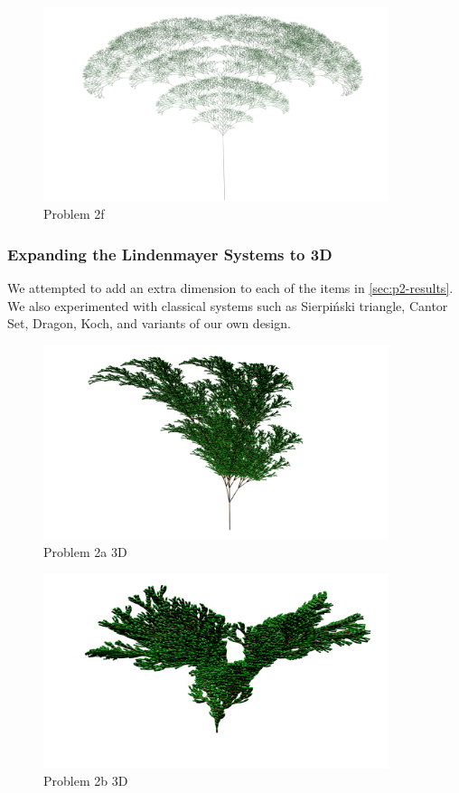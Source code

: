 \begin{figure}[H]
    \centering
    \includegraphics[width=0.90\textwidth]{figures/L-systems/f.png}
    \caption{Problem 2f}\label{fig:prob2f}
\end{figure}

\subsubsection{Expanding the Lindenmayer Systems to 3D}
We attempted to add an extra dimension to each of the items in \autoref{sec:p2-results}.
We also experimented with classical systems such as
Sierpiński triangle, Cantor Set, Dragon, Koch, and variants of our own design.

\begin{figure}[H]
    \centering
    \includegraphics[width=0.90\textwidth]{figures/L-systems/a3d.png}
    \caption{Problem 2a 3D}\label{fig:prob2a_3d}
\end{figure}

\begin{figure}[H]
    \centering
    \includegraphics[width=0.90\textwidth]{figures/L-systems/b3d.png}
    \caption{Problem 2b 3D}\label{fig:prob2b_3d}
\end{figure}

